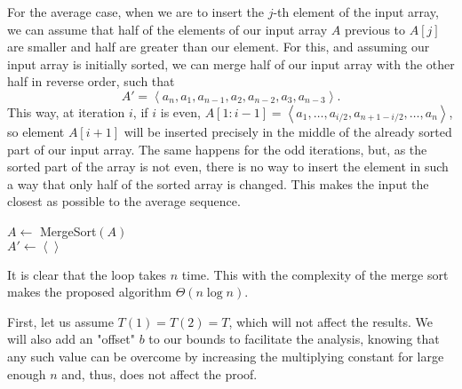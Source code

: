 \documentclass[a4paper]{report}
\begin{document}
For the average case, when we are to insert the $j$-th element of the input array, we can assume that half of the elements of our input array $A$ previous to $A[j]$ are smaller and half are greater than our element. For this, and assuming our input array is initially sorted, we can merge half of our input array with the other half in reverse order, such that \[
A' = \left<a_n,a_1,a_{n-1},a_2,a_{n-2},a_3,a_{n-3} \right>
.\] This way, at iteration $i$, if $i$ is even, $A[1:i-1] = \left<a_1, \ldots, a_{i/2},a_{n+1-i/2},\ldots,a_n\right>$, so element $A[i+1]$ will be inserted precisely in the middle of the already sorted part of our input array. The same happens for the odd iterations, but, as the sorted part of the array is not even, there is no way to insert the element in such a way that only half of the sorted array is changed. This makes the input the closest as possible to the average sequence.


\begin{algorithm}[H] 
    $A \gets $ MergeSort$\left( A \right) $ \\
    $A' \gets \left< \right>$  \\
\end{algorithm}

It is clear that the loop takes $n$ time. This with the complexity of the merge sort makes the proposed algorithm $\Theta\left( n \log n \right) $.


First, let us assume $T\left( 1 \right) =T\left( 2 \right) = T$, which will not affect the results. We will also add an "offset" $b$ to our bounds to facilitate the analysis, knowing that any such value can be overcome by increasing the multiplying constant for large enough $n$ and, thus, does not affect the proof.

\end{document}
